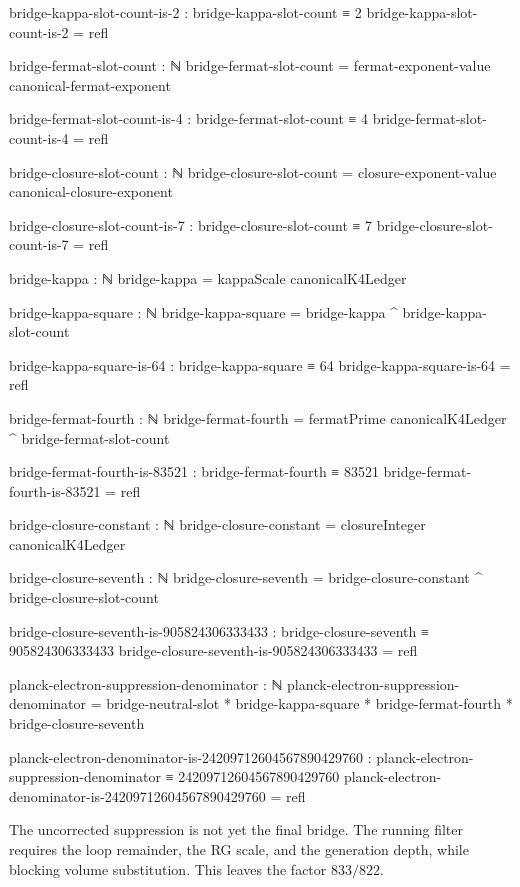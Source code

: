 \documentclass[11pt]{article}
\begin{document}
\begin{code}
bridge-kappa-slot-count-is-2 : bridge-kappa-slot-count ≡ 2
bridge-kappa-slot-count-is-2 = refl

bridge-fermat-slot-count : ℕ
bridge-fermat-slot-count = fermat-exponent-value canonical-fermat-exponent

bridge-fermat-slot-count-is-4 : bridge-fermat-slot-count ≡ 4
bridge-fermat-slot-count-is-4 = refl

bridge-closure-slot-count : ℕ
bridge-closure-slot-count =
  closure-exponent-value canonical-closure-exponent

bridge-closure-slot-count-is-7 : bridge-closure-slot-count ≡ 7
bridge-closure-slot-count-is-7 = refl

bridge-kappa : ℕ
bridge-kappa = kappaScale canonicalK4Ledger

bridge-kappa-square : ℕ
bridge-kappa-square = bridge-kappa ^ bridge-kappa-slot-count

bridge-kappa-square-is-64 : bridge-kappa-square ≡ 64
bridge-kappa-square-is-64 = refl

bridge-fermat-fourth : ℕ
bridge-fermat-fourth =
  fermatPrime canonicalK4Ledger ^ bridge-fermat-slot-count

bridge-fermat-fourth-is-83521 : bridge-fermat-fourth ≡ 83521
bridge-fermat-fourth-is-83521 = refl

bridge-closure-constant : ℕ
bridge-closure-constant = closureInteger canonicalK4Ledger

bridge-closure-seventh : ℕ
bridge-closure-seventh =
  bridge-closure-constant ^ bridge-closure-slot-count

bridge-closure-seventh-is-905824306333433 :
  bridge-closure-seventh ≡ 905824306333433
bridge-closure-seventh-is-905824306333433 = refl

planck-electron-suppression-denominator : ℕ
planck-electron-suppression-denominator =
  bridge-neutral-slot * bridge-kappa-square *
  bridge-fermat-fourth * bridge-closure-seventh

planck-electron-denominator-is-24209712604567890429760 :
  planck-electron-suppression-denominator ≡ 24209712604567890429760
planck-electron-denominator-is-24209712604567890429760 = refl
\end{code}

The uncorrected suppression is not yet the final bridge.  The running filter
requires the loop remainder, the RG scale, and the generation depth, while
blocking volume substitution.  This leaves the factor $833/822$.
\end{document}
